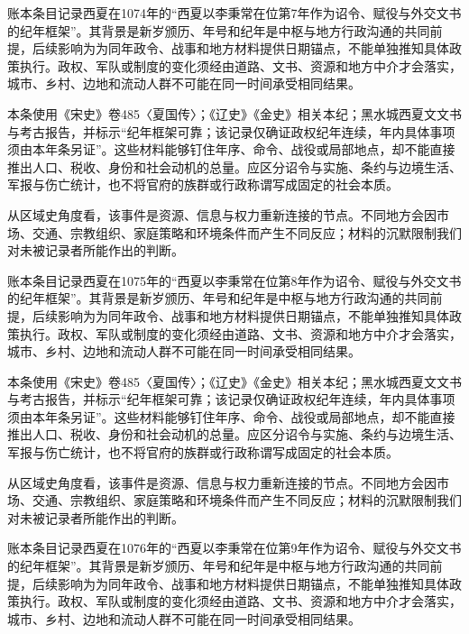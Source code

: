 账本条目记录西夏在1074年的“西夏以李秉常在位第7年作为诏令、赋役与外交文书的纪年框架”。其背景是新岁颁历、年号和纪年是中枢与地方行政沟通的共同前提，后续影响为为同年政令、战事和地方材料提供日期锚点，不能单独推知具体政策执行。政权、军队或制度的变化须经由道路、文书、资源和地方中介才会落实，城市、乡村、边地和流动人群不可能在同一时间承受相同结果。

本条使用《宋史》卷485〈夏国传〉；《辽史》《金史》相关本纪；黑水城西夏文文书与考古报告，并标示“纪年框架可靠；该记录仅确证政权纪年连续，年内具体事项须由本年条另证”。这些材料能够钉住年序、命令、战役或局部地点，却不能直接推出人口、税收、身份和社会动机的总量。应区分诏令与实施、条约与边境生活、军报与伤亡统计，也不将官府的族群或行政称谓写成固定的社会本质。

从区域史角度看，该事件是资源、信息与权力重新连接的节点。不同地方会因市场、交通、宗教组织、家庭策略和环境条件而产生不同反应；材料的沉默限制我们对未被记录者所能作出的判断。

账本条目记录西夏在1075年的“西夏以李秉常在位第8年作为诏令、赋役与外交文书的纪年框架”。其背景是新岁颁历、年号和纪年是中枢与地方行政沟通的共同前提，后续影响为为同年政令、战事和地方材料提供日期锚点，不能单独推知具体政策执行。政权、军队或制度的变化须经由道路、文书、资源和地方中介才会落实，城市、乡村、边地和流动人群不可能在同一时间承受相同结果。

本条使用《宋史》卷485〈夏国传〉；《辽史》《金史》相关本纪；黑水城西夏文文书与考古报告，并标示“纪年框架可靠；该记录仅确证政权纪年连续，年内具体事项须由本年条另证”。这些材料能够钉住年序、命令、战役或局部地点，却不能直接推出人口、税收、身份和社会动机的总量。应区分诏令与实施、条约与边境生活、军报与伤亡统计，也不将官府的族群或行政称谓写成固定的社会本质。

从区域史角度看，该事件是资源、信息与权力重新连接的节点。不同地方会因市场、交通、宗教组织、家庭策略和环境条件而产生不同反应；材料的沉默限制我们对未被记录者所能作出的判断。

账本条目记录西夏在1076年的“西夏以李秉常在位第9年作为诏令、赋役与外交文书的纪年框架”。其背景是新岁颁历、年号和纪年是中枢与地方行政沟通的共同前提，后续影响为为同年政令、战事和地方材料提供日期锚点，不能单独推知具体政策执行。政权、军队或制度的变化须经由道路、文书、资源和地方中介才会落实，城市、乡村、边地和流动人群不可能在同一时间承受相同结果。

